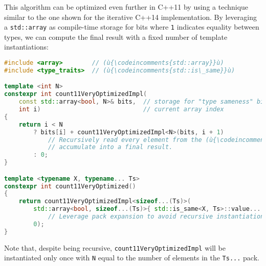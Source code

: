 \noindent This algorithm can be optimized even further in C++11 by using
a technique similar to the one shown for the iterative C++14
implementation. By leveraging a \texttt{std::array} as compile-time
storage for bits where \texttt{1} indicates equality between types, we can compute the final result with a fixed number of template
instantiations:

\begin{lstlisting}[language=C++]
#include <array>        // (ù{\codeincomments{std::array}}ù)
#include <type_traits>  // (ù{\codeincomments{std::is\_same}}ù)

template <int N>
constexpr int count11VeryOptimizedImpl(
    const std::array<bool, N>& bits,  // storage for "type sameness" bits
    int i)                            // current array index
{
    return i < N
        ? bits[i] + count11VeryOptimizedImpl<N>(bits, i + 1)
            // Recursively read every element from the (ù{\codeincomments{bits}}ù) array and
            // accumulate into a final result.
        : 0;
}

template <typename X, typename... Ts>
constexpr int count11VeryOptimized()
{
    return count11VeryOptimizedImpl<sizeof...(Ts)>(
        std::array<bool, sizeof...(Ts)>{ std::is_same<X, Ts>::value... },
            // Leverage pack expansion to avoid recursive instantiations.
        0);
}
\end{lstlisting}

\noindent Note that, despite being recursive, \texttt{count11VeryOptimizedImpl}
will be instantiated only once with \texttt{N} equal to the number of
elements in the \texttt{Ts...} pack.




